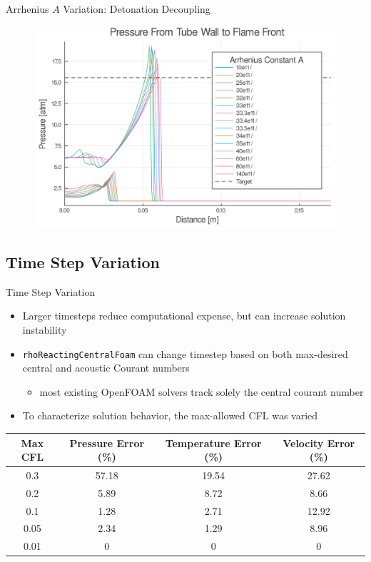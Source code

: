 \begin{frame}{Arrhenius $A$ Variation: Detonation Decoupling}
\begin{figure}
\centering
\includegraphics[width=0.8\linewidth]{../figs/Atest_refined/p_large.png}
\end{figure}
\end{frame}

\subsection{Time Step Variation}

\begin{frame}{Time Step Variation}
\begin{itemize}
\item Larger timesteps reduce computational expense, but can increase solution instability
\item \texttt{rhoReactingCentralFoam} can change timestep based on both max-desired central and acoustic Courant numbers
\begin{itemize}
    \item most existing OpenFOAM solvers track solely the central courant number
\end{itemize}
\item To characterize solution behavior, the max-allowed CFL was varied 
\end{itemize}
\begin{table}[]
\centering
\begin{tabular}{cccc}
Max CFL & Pressure Error (\%) & Temperature Error (\%) & Velocity Error (\%) \\ \hline
0.3 & 57.18 & 19.54 & 27.62 \\ 
0.2 & 5.89 & 8.72 & 8.66 \\
0.1 & 1.28 & 2.71 & 12.92 \\
0.05 & 2.34 & 1.29 & 8.96 \\
0.01 & 0 & 0 & 0 \\
\end{tabular}
\end{table}%
\end{frame}

